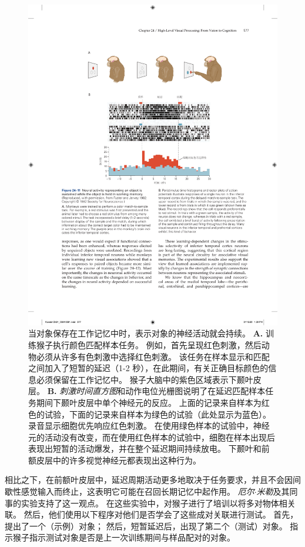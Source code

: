 \begin{figure}[htbp]
	\centering
	\includegraphics[width=0.85\linewidth]{chap24/fig_24_11}
	\caption{当对象保存在工作记忆中时，表示对象的神经活动就会持续。 
		\textbf{A.} 训练猴子执行颜色匹配样本任务。
		例如，首先呈现红色刺激，然后动物必须从许多有色刺激中选择红色刺激。
		该任务在样本显示和匹配之间加入了短暂的延迟（1-2 秒），在此期间，有关正确目标颜色的信息必须保留在工作记忆中。
		猴子大脑中的紫色区域表示下颞叶皮层。
		\textbf{B.} \textit{刺激时间直方图}和动作电位光栅图说明了在延迟匹配样本任务期间下颞叶皮层中单个神经元的反应。
		上面的记录来自样本为红色的试验，下面的记录来自样本为绿色的试验（此处显示为蓝色）。
		录音显示细胞优先响应红色刺激。
		在使用绿色样本的试验中，神经元的活动没有改变，而在使用红色样本的试验中，细胞在样本出现后表现出短暂的活动爆发，并在整个延迟期间持续放电。
		下颞叶和前额皮层中的许多视觉神经元都表现出这种行为。}
	\label{fig:24_11}
\end{figure}


相比之下，在前额叶皮层中，延迟周期活动更多地取决于任务要求，并且不会因间歇性感觉输入而终止，这表明它可能在召回长期记忆中起作用。
\textit{厄尔$\cdot$米勒}及其同事的实验支持了这一观点。
在这些实验中，对猴子进行了培训以将多对物体相关联。 
然后，他们使用以下程序对他们是否学会了这些成对关联进行测试。
首先，提出了一个（示例）对象； 然后，短暂延迟后，出现了第二个（测试）对象。
指示猴子指示测试对象是否是上一次训练期间与样品配对的对象。


